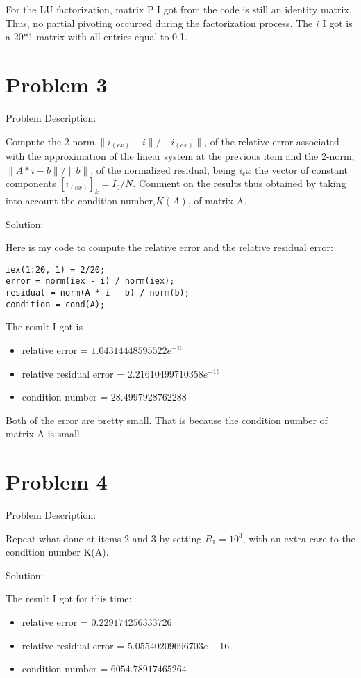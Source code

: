 \documentclass[12pt,letter,english]{article}
\begin{document}
For the LU factorization, matrix P I got from the code is still an identity matrix. Thus, no partial pivoting occurred during the factorization process.
The $i$ I got is a 20*1 matrix with all entries equal to 0.1.

\section*{Problem 3}
Problem Description: 

Compute the 2-norm,$\|i_(ex)-i \| / \|i_(ex) \|$, of the relative error associated with the approximation of the linear system at the previous item and the 2-norm,$\|A*i-b\|/\|b\|$, of the normalized residual, being $i_ex$ the vector of constant components $[i_(ex)]_k = I_0/N$. Comment on the results thus obtained by taking into account the condition number,$K(A)$, of matrix A.

Solution: 

Here is my code to compute the relative error and the relative residual error:
\begin{verbatim}
iex(1:20, 1) = 2/20;
error = norm(iex - i) / norm(iex);
residual = norm(A * i - b) / norm(b);
condition = cond(A);
\end{verbatim}
The result I got is 
\begin{itemize}
\item
relative error = $1.04314448595522e^{-15}$ 
\item
relative residual error = $2.21610499710358e^{-16}$
\item
condition number = $28.4997928762288$
\end{itemize}
Both of the error are pretty small. That is because the condition number of matrix A is small. 

\section*{Problem 4}
Problem Description:

Repeat what done at items 2 and 3 by setting $ R_1 = 10^3$, with an extra care to the condition number K(A).

Solution:

The result I got for this time:
\begin{itemize}
\item
relative error = $0.229174256333726$ 
\item
relative residual error = $5.05540209696703e-16$
\item
condition number = $6054.78917465264$
\end{itemize}
\end{document}
